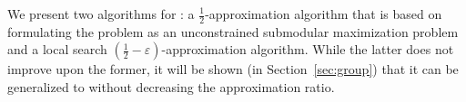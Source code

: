 We present two algorithms for \carpool: a $\frac{1}{2}$-approx\-imation
algorithm that is based on formulating the problem as an unconstrained
submodular maximization problem and a local search $(\frac{1}{2}
- \varepsilon)$-approximation algorithm.  While the latter does not
improve upon the former, it will be shown (in Section~\ref{sec:group})
that it can be generalized to \gcp without decreasing the
approximation ratio.
 
